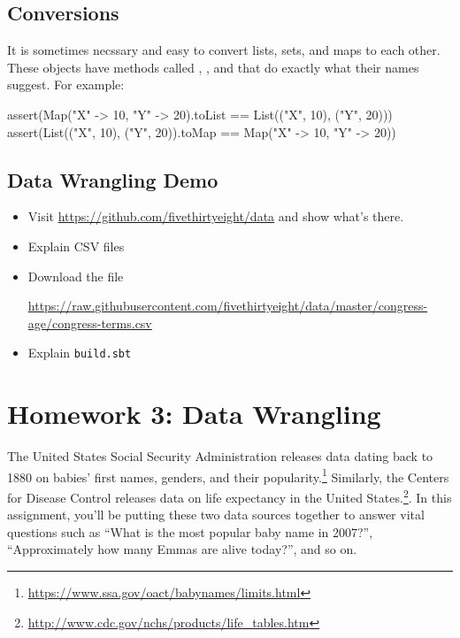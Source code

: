 \documentclass{book}
\begin{document}
\section{Conversions}

It is sometimes necssary and easy to convert lists, sets, and maps to each
other. These objects have methods called ,
, and  that do exactly what their
names suggest. For example:
%
\begin{scalacode}
assert(Map("X" -> 10, "Y" -> 20).toList == List(("X", 10), ("Y", 20)))
assert(List(("X", 10), ("Y", 20)).toMap == Map("X" -> 10, "Y" -> 20))
\end{scalacode}

\begin{instructor}

\section{Data Wrangling Demo}

\begin{itemize}

  \item Visit \url{https://github.com/fivethirtyeight/data} and show what's
  there.

  \item Explain CSV files

  \item Download the file

  \url{https://raw.githubusercontent.com/fivethirtyeight/data/master/congress-age/congress-terms.csv}

  \item Explain \texttt{build.sbt}

\end{itemize}


\end{instructor}

\chapter{\texorpdfstring{Homework 3: Data Wrangling}{file:hw/hw3}}


The United States Social Security Administration releases data dating back to
1880 on babies' first names, genders, and their
popularity.\footnote{\url{https://www.ssa.gov/oact/babynames/limits.html}}
Similarly, the Centers for Disease Control releases data on life expectancy
in the United States.\footnote{\url{http://www.cdc.gov/nchs/products/life_tables.htm}}.
In this assignment, you'll be putting these two data sources together
to answer vital questions such as ``What is the most popular baby name in 2007?'',
``Approximately how many Emmas are alive today?'', and so on.
\end{document}
